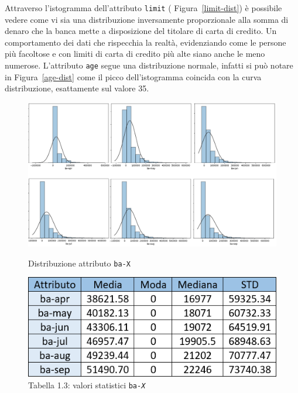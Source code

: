 Attraverso l'istogramma dell'attributo \texttt{limit} ( Figura~\ref{limit-dist}) \`e possibile vedere come vi sia una distribuzione inversamente proporzionale alla somma di denaro che la banca mette a disposizione del titolare di carta di credito. Un comportamento dei dati che rispecchia la realt\`a, evidenziando come le persone pi\`u facoltose e con limiti di carta di credito pi\`u alte siano anche le meno numerose. L'attributo \texttt{age} segue una distribuzione normale, infatti si pu\`o notare in Figura~\ref{age-dist} come il picco dell'istogramma coincida con la curva distribuzione, esattamente sul valore 35.

\begin{figure}[!htb]
  \includegraphics[width=\linewidth]{img/ba-distribution.png}
  \caption{Distribuzione attributo \texttt{ba-X}}\label{ba-dist}
\endminipage\hfill
{}
  \includegraphics[width=\linewidth]{img/ba-stat.png}
\captionsetup{labelformat=empty}
\caption{Tabella 1.3: valori statistici \texttt{ba-\textit{X}}}
\label{ba-stat}
\endminipage\hfill
\end{figure}

